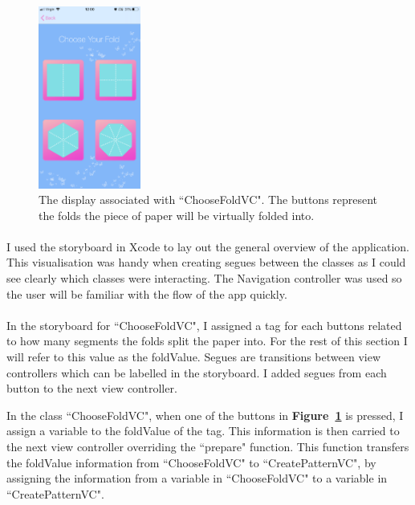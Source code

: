 \documentclass[11pt]{article}
\begin{document}
    \begin{figure}
                        \centering
                        \includegraphics[width=0.3\textwidth]{KiriZen/chooseFold.png}
                        \caption{The display associated with ``ChooseFoldVC". The buttons represent the folds the piece of paper will be virtually folded into.}
                        \label{fig:kiriZen-chooseFold}
                    \end{figure}
    

    \paragraph{}
    I used the storyboard in Xcode to lay out the general overview of the application. This visualisation was handy when creating segues between the classes as I could see clearly which classes were interacting. The Navigation controller was used so the user will be familiar with the flow of the app quickly.

        \paragraph{}
            In the storyboard for ``ChooseFoldVC", I assigned a tag for each buttons related to how many segments the folds split the paper into. For the rest of this section I will refer to this value as the foldValue. Segues are transitions between view controllers which can be labelled in the storyboard. I added segues from each button to the next view controller.
                    
            In the class ``ChooseFoldVC", when one of the buttons in \textbf{Figure~\ref{fig:kiriZen-chooseFold}} is pressed, I assign a variable to the foldValue of the tag. This information is then carried to the next view controller overriding the ``prepare" function. This function transfers the foldValue information from ``ChooseFoldVC" to ``CreatePatternVC", by assigning the information from a variable in ``ChooseFoldVC" to a variable in ``CreatePatternVC".
                    
\end{document}

